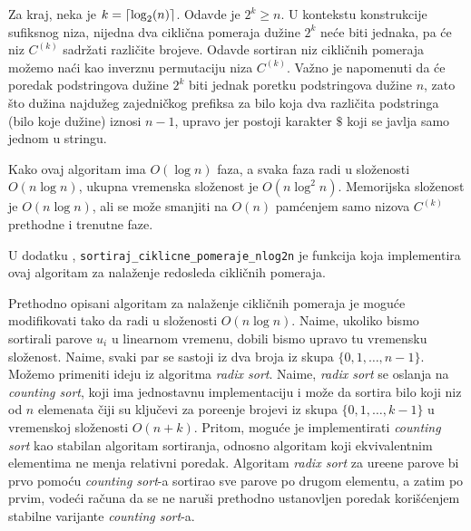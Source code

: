 Za kraj, neka je $k = \left \lceil \log_2(n) \right \rceil$. Odavde je $2^k \geq n$. U kontekstu konstrukcije sufiksnog niza, nijedna dva cikli\v cna pomeraja du\v zine $2^k$ ne\' ce biti jednaka, pa \' ce niz $C^{(k)}$ sadr\v zati razli\v cite brojeve. Odavde sortiran niz cikli\v cnih pomeraja mo\v zemo na\' ci kao inverznu permutaciju niza $C^{(k)}$. Va\v zno je napomenuti da \' ce poredak podstringova du\v zine $2^k$ biti jednak poretku podstringova du\v zine $n$, zato \v sto du\v zina najdu\v zeg zajedni\v ckog prefiksa za bilo koja dva razli\v cita podstringa (bilo koje du\v zine) iznosi $n-1$, upravo jer postoji karakter $\$$ koji se javlja samo jednom u stringu.

Kako ovaj algoritam ima $O(\log n)$ faza, a svaka faza radi u slo\v zenosti $O(n \log n)$, ukupna vremenska slo\v zenost je $O(n \log^2 n)$. Memorijska slo\v zenost je $O(n \log n)$, ali se mo\v ze smanjiti na $O(n)$ pam\' cenjem samo nizova $C^{(k)}$ prethodne i trenutne faze.

U dodatku \sirdodatakkod{}, \texttt{sortiraj\_ciklicne\_pomeraje\_nlog2n} je funkcija koja implementira ovaj algoritam za nala\v zenje redosleda cikli\v cnih pomeraja.


Prethodno opisani algoritam za nala\v zenje cikli\v cnih pomeraja je mogu\' ce modifikovati tako da radi u slo\v zenosti $O(n \log n)$. Naime, ukoliko bismo sortirali parove $u_i$ u linearnom vremenu, dobili bismo upravo tu vremensku slo\v zenost. Naime, svaki par se sastoji iz dva broja iz skupa $\{0, 1, \ldots, n-1\}$. Mo\v zemo primeniti ideju iz algoritma \textit{radix sort}. Naime, \textit{radix sort} se oslanja na \textit{counting sort}, koji ima jednostavnu implementaciju i mo\v ze da sortira bilo koji niz od $n$ elemenata \v ciji su klju\v cevi za pore\dj enje brojevi iz skupa $\{0, 1, \ldots, k-1\}$ u vremenskoj slo\v zenosti $O(n+k)$. Pritom, mogu\' ce je implementirati \textit{counting sort} kao stabilan algoritam sortiranja, odnosno algoritam koji ekvivalentnim elementima ne menja relativni poredak. Algoritam \textit{radix sort} za ure\dj ene parove bi prvo pomo\' cu \textit{counting sort}-a sortirao sve parove po drugom elementu, a zatim po prvim, vode\' ci ra\v cuna da se ne naru\v si prethodno ustanovljen poredak kori\v s\' cenjem stabilne varijante \textit{counting sort}-a.

